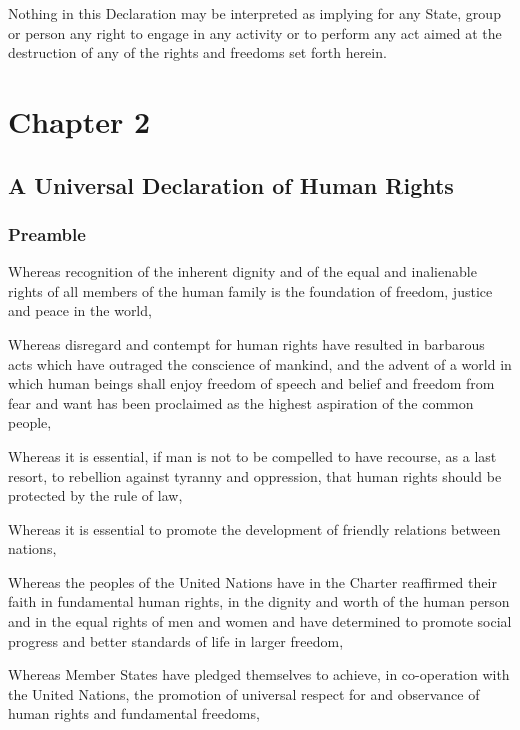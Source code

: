 \documentclass[
  titlepage,
  openright,
  DIV=calc,
  toc=listof,
  listof=nochaptergap]{scrbook}
\begin{document}
Nothing in this Declaration may be interpreted as implying for any
State, group or person any right to engage in any activity or to perform
any act aimed at the destruction of any of the rights and freedoms set
forth herein.

\hypertarget{sec:chapter2}{%
\chapter{Chapter 2}\label{sec:chapter2}}

\hypertarget{a-universal-declaration-of-human-rights-1}{%
\section{A Universal Declaration of Human
Rights}\label{a-universal-declaration-of-human-rights-1}}

\hypertarget{preamble-1}{%
\subsection{Preamble}\label{preamble-1}}

Whereas recognition of the inherent dignity and of the equal and
inalienable rights of all members of the human family is the foundation
of freedom, justice and peace in the world,

Whereas disregard and contempt for human rights have resulted in
barbarous acts which have outraged the conscience of mankind, and the
advent of a world in which human beings shall enjoy freedom of speech
and belief and freedom from fear and want has been proclaimed as the
highest aspiration of the common people,

Whereas it is essential, if man is not to be compelled to have recourse,
as a last resort, to rebellion against tyranny and oppression, that
human rights should be protected by the rule of law,

Whereas it is essential to promote the development of friendly relations
between nations,

Whereas the peoples of the United Nations have in the Charter reaffirmed
their faith in fundamental human rights, in the dignity and worth of the
human person and in the equal rights of men and women and have
determined to promote social progress and better standards of life in
larger freedom,

Whereas Member States have pledged themselves to achieve, in
co-operation with the United Nations, the promotion of universal respect
for and observance of human rights and fundamental freedoms,
\end{document}
